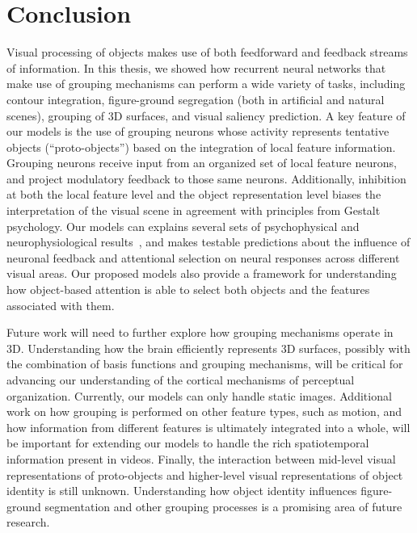 \chapter{Conclusion}
\label{sec:conclusion}

Visual processing of objects makes use of both feedforward and feedback streams of information. In this thesis, we showed how recurrent neural networks that make use of grouping mechanisms can perform a wide variety of tasks, including contour integration, figure-ground segregation (both in artificial and natural scenes), grouping of 3D surfaces, and visual saliency prediction. A key feature of our models is the use of grouping neurons whose activity represents tentative objects (“proto-objects”) based on the integration of local feature information. Grouping neurons receive input from an organized set of local feature neurons, and project modulatory feedback to those same neurons. Additionally, inhibition at both the local feature level and the object representation level biases the interpretation
of the visual scene in agreement with principles from Gestalt psychology. Our models can explains several sets of psychophysical and neurophysiological results~\citep{He_Nakayama95,Zhou_etal00,Qiu_etal07,Chen_etal14,Williford_vonderHeydt16}, and makes testable predictions about the influence of neuronal feedback and attentional selection on neural responses across different visual areas. Our proposed models also provide a framework for understanding how object-based attention is able to select both objects and the features associated with them.

Future work will need to further explore how grouping mechanisms operate in 3D. Understanding how the brain efficiently represents 3D surfaces, possibly with the combination of basis functions and grouping mechanisms, will be critical for advancing our understanding of the cortical mechanisms of perceptual organization. Currently, our models can only handle static images. Additional work on how grouping is performed on other feature types, such as motion, and how information from different features is ultimately integrated into a whole, will be important for extending our models to handle the rich spatiotemporal information present in videos. Finally, the interaction between mid-level visual representations of proto-objects and higher-level visual representations of object identity is still unknown. Understanding how object identity influences figure-ground segmentation and other grouping processes is a promising area of future research.